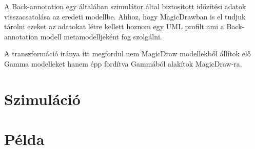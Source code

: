 A Back-annotation egy általában szimulátor által biztosított időzítési adatok visszacsatolása az eredeti modellbe. Ahhoz, hogy MagicDrawban is el tudjuk tárolni ezeket az adatokat létre kellett hoznom egy UML profilt ami a Back-annotation modell metamodelljeként fog szolgálni.

A transzformáció iránya itt megfordul nem MagicDraw modellekből állítok elő Gamma modelleket hanem épp fordítva Gammából alakítok MagicDraw-ra.



\section{Szimuláció}

\section{Példa} %
